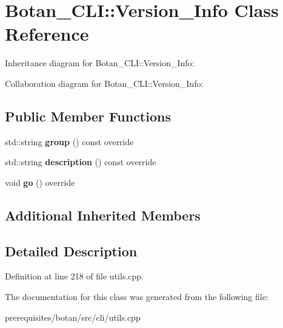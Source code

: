 \hypertarget{class_botan___c_l_i_1_1_version___info}{}\section{Botan\+\_\+\+C\+LI\+:\+:Version\+\_\+\+Info Class Reference}
\label{class_botan___c_l_i_1_1_version___info}


Inheritance diagram for Botan\+\_\+\+C\+LI\+:\+:Version\+\_\+\+Info\+:


Collaboration diagram for Botan\+\_\+\+C\+LI\+:\+:Version\+\_\+\+Info\+:
\subsection*{Public Member Functions}
\begin{DoxyCompactItemize}
\item 
\mbox{\label{class_botan___c_l_i_1_1_version___info_aa07547ecb3f94c344622c5630815109d}} 
std\+::string {\bfseries group} () const override
\item 
\mbox{\label{class_botan___c_l_i_1_1_version___info_addcd1508bc30d170ddfea150e9401416}} 
std\+::string {\bfseries description} () const override
\item 
\mbox{\label{class_botan___c_l_i_1_1_version___info_a2b01be8482b78982d9e940cf8522e2b8}} 
void {\bfseries go} () override
\end{DoxyCompactItemize}
\subsection*{Additional Inherited Members}


\subsection{Detailed Description}


Definition at line 218 of file utils.\+cpp.



The documentation for this class was generated from the following file\+:\begin{DoxyCompactItemize}
\item 
prerequisites/botan/src/cli/utils.\+cpp\end{DoxyCompactItemize}
